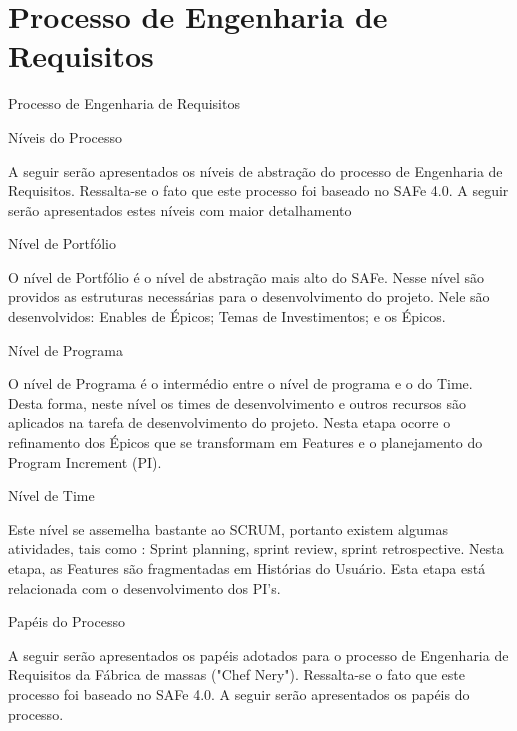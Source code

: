 
\chapter[Processo de Engenharia de Requisitos]{Processo de Engenharia de Requisitos}
{
	\large{Processo de Engenharia de Requisitos\\}

}

{
	\large{Níveis do Processo\\}

	\tab A seguir serão apresentados os níveis de abstração do processo de Engenharia de Requisitos. Ressalta-se o fato que este processo foi baseado no SAFe 4.0. A seguir serão apresentados estes níveis com maior detalhamento\\ 

}

{
	\large{Nível de Portfólio\\}

	\tab O nível de Portfólio é o nível de abstração mais alto do SAFe. Nesse nível são providos as estruturas necessárias para o desenvolvimento do projeto.  Nele são desenvolvidos: Enables de Épicos; Temas de Investimentos; e os Épicos. \\

}

{
	 \large{Nível de Programa\\}

	 \tab O nível de Programa é o intermédio entre o nível de programa e o do Time. Desta forma, neste nível os times de desenvolvimento e outros recursos são aplicados na tarefa de desenvolvimento do projeto.  Nesta etapa ocorre o refinamento dos Épicos que se transformam em Features e o planejamento do Program Increment (PI).\\
}

{
	\large{Nível de Time\\}

	\tab Este nível se assemelha bastante ao SCRUM,  portanto existem algumas atividades, tais como : Sprint planning, sprint review, sprint retrospective. Nesta etapa, as Features são fragmentadas em Histórias do Usuário. Esta etapa está relacionada com o desenvolvimento dos PI’s. \\
}

{
	\large{Papéis do Processo\\}

	\tab A seguir serão apresentados os papéis adotados para o processo de Engenharia de Requisitos da Fábrica de massas ("Chef Nery"). Ressalta-se o fato que este processo foi baseado no SAFe 4.0. A seguir serão apresentados os papéis do processo.\\

}


